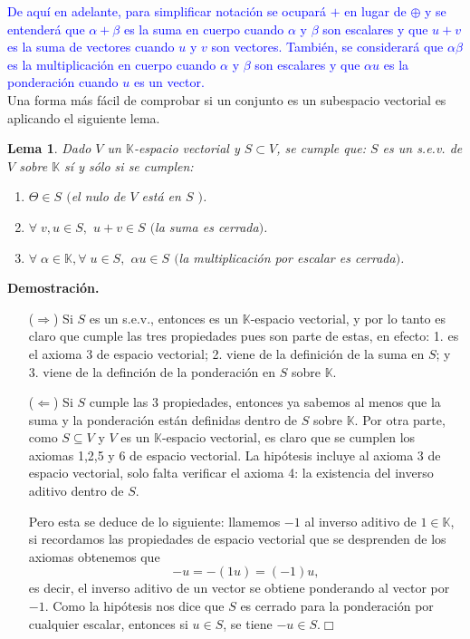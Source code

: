 \documentclass[12pt]{book}
\newtheorem{lema}{Lema}
\def\K{\mathbb{K}}
\begin{document}
\textcolor{blue}{De aqu\'i en adelante, para simplificar notaci\'on se ocupar\'a $+$ en lugar de $\oplus$ y se entender\'a que $\alpha+\beta$ es la suma en cuerpo cuando $\alpha$ y $\beta$ son escalares y que $u+v$ es la suma de vectores cuando $u$ y $v$ son vectores. Tambi\'en, se considerar\'a que $\alpha \beta$ es la multiplicaci\'on en cuerpo cuando $\alpha$ y $\beta$ son escalares y que $\alpha u$ es la ponderación cuando $u$ es un vector.}\\

Una forma m\'as f\'acil de comprobar si un conjunto es un subespacio vectorial es aplicando el siguiente lema.\\

\begin{lema}
  Dado $V$ un $\K$-espacio vectorial y $S\subset V$, se cumple que:
  $S$ es un s.e.v. de $V$ sobre $\K$ s\'i y s\'olo si se cumplen:
\begin{enumerate}
\item $\Theta\in S$ $($el nulo de $V$ est\'a en $S$ $)$.
\item $\forall\;v,u\in S,$ $u+v\in S$ $($la suma es cerrada$)$.
\item $\forall\;\alpha\in\K,$\;$\forall\;u\in S,$ $\alpha u\in S$ $($la multiplicaci\'on por escalar es cerrada$)$.
\end{enumerate}
\end{lema}
    {\bf Demostración.} {
      \begin{itemize}
      \item[($\Rightarrow$)] Si $S$ es un s.e.v., entonces es un $\K$-espacio vectorial, y por lo tanto es claro que cumple las tres propiedades pues son parte de estas, en efecto: 1. es el axioma 3 de espacio vectorial; 2. viene de la definición de la suma en $S$; y 3. viene de la definción de la ponderación en $S$ sobre $\K$.
      \item[($\Leftarrow$)] Si $S$ cumple las 3 propiedades, entonces ya sabemos al menos que la suma y la ponderación están definidas dentro de $S$ sobre $\K$.
        Por otra parte, como $S\subseteq V$ y $V$ es un $\K$-espacio vectorial, es claro que se cumplen los axiomas 1,2,5 y 6 de espacio vectorial.
        La hipótesis incluye al axioma 3 de espacio vectorial, solo falta verificar el axioma 4: la existencia del inverso aditivo dentro de $S$.
        
        Pero esta se deduce de lo siguiente: llamemos $-1$ al inverso aditivo de $1\in\K$, si recordamos las propiedades de espacio vectorial que se desprenden de los axiomas obtenemos que $$-u=-(1u)=(-1)u,$$ es decir, el inverso aditivo de un vector se obtiene ponderando al vector por $-1$.
        Como la hipótesis nos dice que $S$ es cerrado para la ponderación por cualquier escalar, entonces si $u\in S$, se tiene $-u\in S$.\hfill $\Box$
        \end{itemize}
      }
\end{document}
